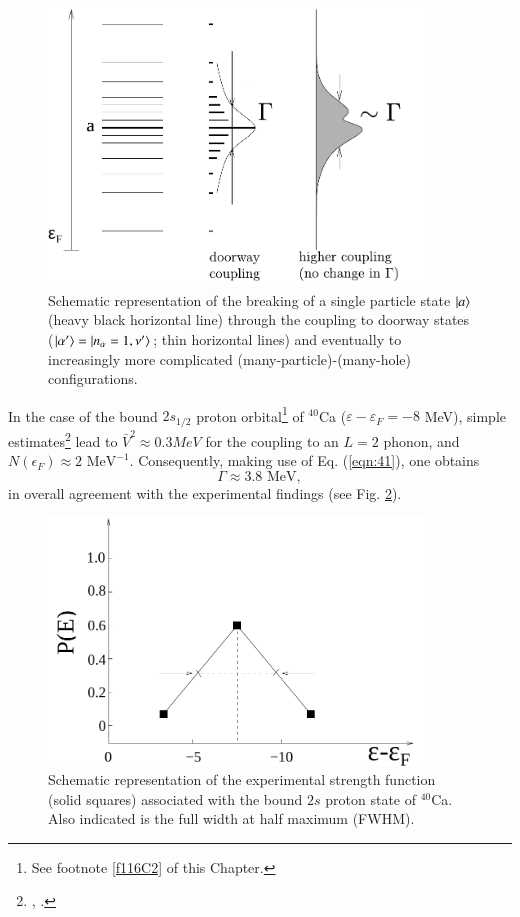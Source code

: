 \begin{figure}
\centerline {
\includegraphics*[width=10cm]{introduccion/figs/figintroD7}
}
\caption[Coupling of single-particle states with doorway states.]{Schematic representation of the breaking of a single particle state $|{a} \rangle$ (heavy black horizontal line) through the coupling to doorway states ($|{\alpha'} \rangle=|{n_\alpha=1,\nu'} \rangle$; thin horizontal lines) and eventually to increasingly more complicated (many-particle)-(many-hole) configurations.}
\label{fig:4.7}
\end{figure}

In the case of the bound $2s_{1/2}$ proton orbital\footnote{See footnote \ref{f116C2} of this Chapter.} of $^{40}$Ca ($\varepsilon - \varepsilon_F = -8$ MeV), simple estimates\footnote{\cite{Mahaux:85}, \cite{Mougey:76}.} lead to $\bar{V}^2 \approx 0.3 MeV$ for the coupling to an $L=2$ phonon, and $N(\epsilon_F) \approx 2\text{ MeV}^{-1}$. Consequently, making use of Eq. (\ref{eqn:41}), one obtains
\begin{equation}
\Gamma \approx 3.8 \text{ MeV} ,
\label{eqn:46}
\end{equation}
in overall agreement with the experimental findings (see Fig. \ref{fig:4.8}).
\begin{figure}[h!]
\centerline {
\includegraphics*[width=10cm]{introduccion/figs/figintroD8}}
\caption[Schematic representation of the experimental strength function associated with the bound $2s$ proton state of $^{40}$Ca.]{Schematic representation of the experimental strength function (solid squares) associated with the bound $2s$ proton state of $^{40}$Ca. Also indicated is the full width at half maximum (FWHM).}
\label{fig:4.8}
\end{figure}


